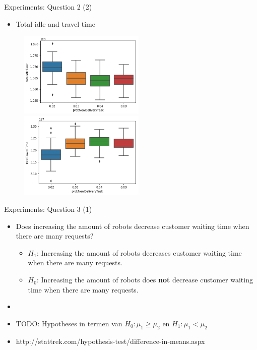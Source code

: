 \begin{frame}{Experiments: Question 2 (2)}
    \begin{itemize}
        \item Total idle and travel time
    \end{itemize}

    \begin{figure}[!hbt]
        \begin{adjustbox}{center}
            \includegraphics[width=6cm]{imgs/question2-plot1}
            \includegraphics[width=6cm]{imgs/question2-plot2}
        \end{adjustbox}
    \end{figure}
\end{frame}


\begin{frame}{Experiments: Question 3 (1)}
    \begin{itemize}
        \item Does increasing the amount of robots decrease customer waiting time when there are many requests?
        \begin{itemize}
                \item $H_1$: Increasing the amount of robots decreases customer waiting time when there are many requests.
                \item $H_0$: Increasing the amount of robots does \textbf{not} decrease customer waiting time when there are many requests.
        \end{itemize}

        \item[]
        \item TODO: Hypotheses in termen van $H_0: \mu_1 \geq \mu_2$ en $H_1: \mu_1 < \mu_2$
        \item http://stattrek.com/hypothesis-test/difference-in-means.aspx
    \end{itemize}
\end{frame}



